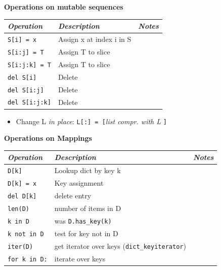 \documentclass[9pt,a4wide]{extarticle}
\begin{document}
\bigskip
{\bf Operations on mutable sequences}
{}

\begin{supertabular}{|l|p{12cm}|c|}\hline
{\em Operation }     &   {\em  Description}         & {\em  Notes} \\ \hline\hline

{\tt S[i] = x}       &   Assign x at index i in S   &        \\ \hline
{\tt S[i:j] = T}     &   Assign T to slice          &        \\ \hline
{\tt S[i:j:k] = T}   &   Assign T to slice          &        \\ \hline
{\tt del S[i]}       &   Delete                     &        \\ \hline
{\tt del S[i:j]}     &   Delete                     &        \\ \hline
{\tt del S[i:j:k]}   &   Delete                     &        \\ \hline
\end{supertabular}


\begin{itemize}
\item Change L {\em in place}: {\tt L[:] = [}{\em list compr. with L} {\tt ]}
\end{itemize}


\bigskip
{\bf Operations on Mappings}
{}

\begin{supertabular}{|l|p{12cm}|c|}\hline
{\em Operation }     &   {\em  Description}         & {\em  Notes} \\ \hline\hline

{\tt D[k]}            &  Lookup dict by key k       &        \\ \hline
{\tt D[k] = x}        &  Key assignment             &        \\ \hline
{\tt del D[k]}        &  delete entry               &        \\ \hline
{\tt len(D)}          &  number of items in D       &        \\ \hline
{\tt k in D}          &  was {\tt D.has\_key(k)}    &        \\ \hline
{\tt k not in D}      &  test for key not in D      &        \\ \hline
{\tt iter(D)}         &  get iterator over keys ({\tt dict\_keyiterator})     &        \\ \hline
{\tt for k in D:}     &  iterate over keys          &        \\ \hline
\end{supertabular}
\end{document}
